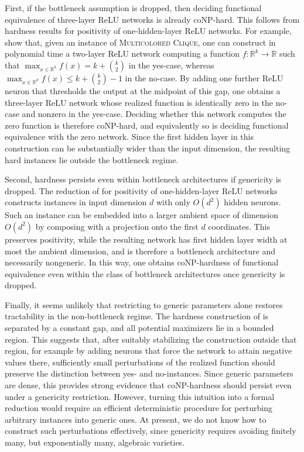 \documentclass{article}
\theoremstyle{definition}
\newcommand{\R}{\mathbb{R}}
\begin{document}
First, if the bottleneck assumption is dropped, then deciding functional equivalence of three-layer ReLU networks is already coNP-hard. 
This follows from hardness results for positivity of one-hidden-layer ReLU networks. 
For example, \citet{froese2026parameterized} show that, given an instance of \textsc{Multicolored Clique}, one can construct in polynomial time a two-layer ReLU network computing a function 
$
f\colon \R^k\to\R
$
such that 
$
\max_{x\in\R^k} f(x)=k+\binom{k}{2} 
$
in the yes-case, whereas 
$
\max_{x\in\R^k} f(x)\le k+\binom{k}{2}-1
$
in the no-case. 
By adding one further ReLU neuron that thresholds the output at the midpoint of this gap, one obtains a three-layer ReLU network whose realized function is identically zero in the no-case and nonzero in the yes-case. 
Deciding whether this network computes the zero function is therefore coNP-hard, and equivalently so is deciding functional equivalence with the zero network. 
Since the first hidden layer in this construction can be substantially wider than the input dimension, the resulting hard instances lie outside the bottleneck regime. 

Second, hardness persists even within bottleneck architectures if genericity is dropped. 
The reduction of \citet{pmlr-v291-froese25a} for positivity of one-hidden-layer ReLU networks constructs instances in input dimension $d$ with only $O(d^2)$ hidden neurons. 
Such an instance can be embedded into a larger ambient space of dimension $O(d^2)$ by composing with a projection onto the first $d$ coordinates. 
This preserves positivity, while the resulting network has first hidden layer width at most the ambient dimension, and is therefore a bottleneck architecture and necessarily nongeneric. 
In this way, one obtains coNP-hardness of functional equivalence even within the class of bottleneck architectures once genericity is dropped. 


Finally, it seems unlikely that restricting to generic parameters alone restores tractability in the non-bottleneck regime. 
The hardness construction of \cite{froese2026parameterized} is separated by a constant gap, and all potential maximizers lie in a bounded region. 
This suggests that, after suitably stabilizing the construction outside that region, for example by adding neurons that force the network to attain negative values there, 
sufficiently small perturbations of the realized function should preserve the distinction between yes- and no-instances. 
Since generic parameters are dense, this provides strong evidence that coNP-hardness should persist even under a genericity restriction. 
However, turning this intuition into a formal reduction would require an efficient deterministic procedure for perturbing arbitrary instances into generic ones. 
At present, we do not know how to construct such perturbations effectively, since genericity requires avoiding finitely many, but exponentially many, algebraic varieties. 
\end{document}
